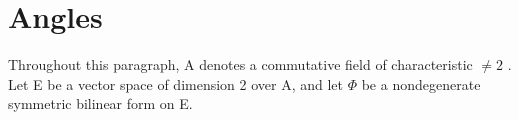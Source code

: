 \section{Angles}

Throughout this paragraph, A denotes a commutative field of characteristic \(\neq 2\) . Let E be a vector space of dimension 2 over A, and let \(\Phi\) be a nondegenerate symmetric bilinear form on E.

